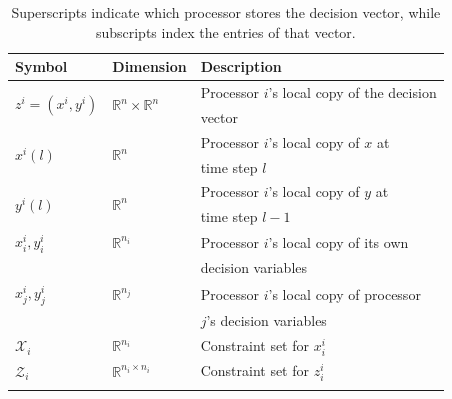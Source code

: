 \documentclass[9pt,shortpaper,twoside,web]{ieeecolor}
\newcommand{\R}{\ensuremath{\mathbb{R}}\xspace}
\newcommand{\X}{\ensuremath{\mathcal{X}}\xspace}
\newcommand{\Z}{\ensuremath{\mathcal{Z}}\xspace}
\newcommand{\blue}[1]{{\textcolor{blue}{#1}}}
\begin{document}
\begin{table}[t]
\centering
\begin{tabular}{lll}
        \toprule
        Symbol & Dimension &
        Description \\
        \midrule
        \multirow{2}{*}{$z^i=(x^i,y^i)$ }& \multirow{2}{*}{$\R^n\times \R^n$} & Processor $i$'s local copy of the decision\\ &&  vector \\
        \hline
        \multirow{2}{*}{$x^i(l)$ } & \multirow{2}{*}{$\R^n$} & Processor $i$'s local copy of $x$ at \\ && time step $l$ \\ \hline
        \multirow{2}{*}{$y^i(l)$}& \multirow{2}{*}{$\R^n$}& Processor $i$'s local copy of $y$ at \\ & & time step $l-1$ \\\hline
        \addlinespace
        $x^i_i,y^i_i$ & $\R^{n_i}$ &  Processor $i$'s local copy of its own\\ && decision variables \\
        \hline
        \addlinespace $x^i_j,y^i_j$ & $\R^{n_j}$  & Processor $i$'s local copy of processor\\ &&  $j$'s decision variables \\ \addlinespace \hline \addlinespace
        $\X_i$ & $\R^{n_i}$ & Constraint set for $x^i_i$ 
        \\ \addlinespace \hline \addlinespace
        $\Z_i$ & $\R^{n_i\times n_i}$ & Constraint set for $z_i^i$ \\ \addlinespace
        \bottomrule
\end{tabular}
\caption{
Superscripts indicate which processor stores the decision vector, while subscripts index the entries of that vector.
}
\label{tab:notation}
\end{table}
\end{document}
